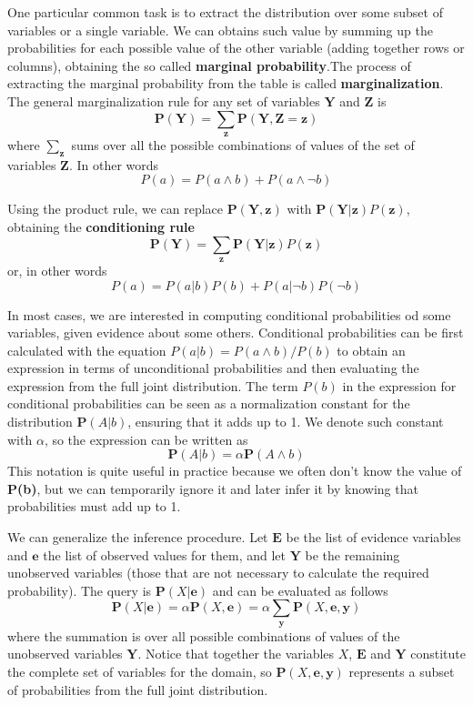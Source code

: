 \documentclass{article}
\begin{document}
One particular common task is to extract the distribution over some subset of variables or a single variable. We can obtains such value by summing up the probabilities for each possible value of the other variable (adding together rows or columns), obtaining the so called \textbf{marginal probability}.The process of extracting the marginal probability from the table is called \textbf{marginalization}. The general marginalization rule for any set of variables $\textbf{Y}$ and $\textbf{Z}$ is 
$$\textbf{P}(\textbf{Y})=\sum_\textbf{z}\textbf{P}(\textbf{Y},\textbf{Z}=\textbf{z})$$
where $\sum_\textbf{z}$ sums over all the possible combinations of values of the set of variables $\textbf{Z}$. In other words
$$P(a) = P(a\land b) + P(a\land \neg b)$$

Using the product rule, we can replace $\textbf{P}(\textbf{Y}, \textbf{z})$ with $\textbf{P}(\textbf{Y}|\textbf{z})P(\textbf{z})$, obtaining the \textbf{conditioning rule}
$$\textbf{P}(\textbf{Y}) = \sum_\textbf{z}\textbf{P}(\textbf{Y}|\textbf{z})P(\textbf{z})$$
or, in other words
$$P(a) = P(a|b)P(b)+P(a|\neg b)P(\neg b)$$

In most cases, we are interested in computing conditional probabilities od some variables, given evidence about some others. Conditional probabilities can be  first calculated with the equation $P(a|b) = P(a\land b) / P(b)$
to obtain an expression in terms of unconditional probabilities and then evaluating the expression from the full joint distribution. The term $P(b)$ in the expression for conditional probabilities can be seen as a normalization constant for the distribution $\textbf{P}(A|b)$, ensuring that it adds up to 1. We denote such constant with $\alpha$, so the expression can be written as
$$\textbf{P}(A|b)=\alpha \textbf{P}(A\land b)$$
This notation is quite useful in practice because we often don't know the value of \textbf{P(b)}, but we can temporarily ignore it and later infer it by knowing that probabilities must add up to 1.

We can generalize the inference procedure. Let $\textbf{E}$ be the list of evidence variables and $\textbf{e}$ the list of observed values for them, and let $\textbf{Y}$ be the remaining unobserved variables (those that are not necessary to calculate the required probability). The query is $\textbf{P}(X|\textbf{e})$ and can be evaluated as follows
$$\textbf{P}(X|\textbf{e})=\alpha\textbf{P}(X,\textbf{e})=\alpha\sum_\textbf{y}\textbf{P}(X,\textbf{e},\textbf{y})$$
where the summation is over all possible combinations of values of the unobserved variables $\textbf{Y}$. Notice that together the variables $X$, $\textbf{E}$ and $\textbf{Y}$ constitute the complete set of variables for the domain, so $\textbf{P}(X,\textbf{e},\textbf{y})$ represents a subset of probabilities from the full joint distribution.
\end{document}
